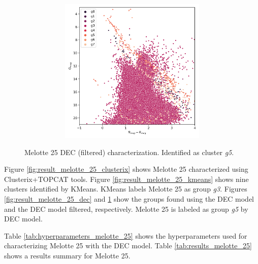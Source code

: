 \documentclass[11pt, a4paper, english]{book}
\begin{document}
\begin{figure}[H]
\begin{subfigure}{0.9\textwidth}
\begin{subfigure}[t]{0.30\textwidth}
    \end{subfigure}
    \hfill
    \begin{subfigure}[t]{0.30\textwidth}
      \centering
      \includegraphics[width=\textwidth]{../figures/melotte_25/dec_hr_diagram_filtered_melotte_25.png}
    \end{subfigure}
  \end{subfigure}
  \caption{Melotte 25 DEC (filtered) characterization. Identified as cluster \emph{g5}.}
  \label{fig:result_melotte_25_dec_filtered}
\end{figure}

\newpage

Figure \ref{fig:result_melotte_25_clusterix} shows Melotte 25 characterized using Clusterix+TOPCAT tools.
Figure \ref{fig:result_melotte_25_kmeans} shows nine clusters identified by KMeans.
KMeans labels Melotte 25 as group \emph{g3}.
Figures \ref{fig:result_melotte_25_dec} and \ref{fig:result_melotte_25_dec_filtered}
show the groups found using the DEC model and the DEC model filtered, respectively.
Melotte 25 is labeled as group \emph{g5} by DEC model.

Table \ref{tab:hyperparameters_melotte_25} shows the hyperparameters used for characterizing Melotte 25
with the DEC model. Table \ref{tab:results_melotte_25} shows a results summary for Melotte 25.
\end{document}
